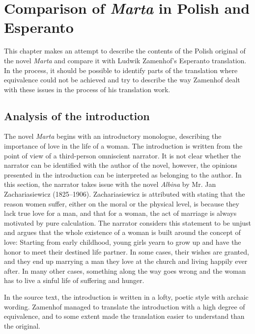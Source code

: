 
\chapter{Comparison of \textit{Marta} in Polish and Esperanto}

This chapter makes an attempt to describe the contents of the Polish original of the novel \textit{Marta} and compare it with Ludwik Zamenhof's Esperanto translation.
In the process, it should be possible to identify parts of the translation where equivalence could not be achieved and try to describe the way Zamenhof dealt with these issues in the process of his translation work.

\section{Analysis of the introduction}

The novel \textit{Marta} begins with an introductory monologue, describing the importance of love in the life of a woman.
The introduction is written from the point of view of a third-person omniscient narrator.
It is not clear whether the narrator can be identified with the author of the novel, however, the opinions presented in the introduction can be interpreted as belonging to the author.
In this section, the narrator takes issue with the novel \textit{Albina} by Mr. Jan Zachariasiewicz (1825--1906).
Zachariasiewicz is attributed with stating that the reason women suffer, either on the moral or the physical level, is because they lack true love for a man, and that for a woman, the act of marriage is always motivated by pure calculation.
The narrator considers this statement to be unjust and argues that the whole existence of a woman is built around the concept of love:
Starting from early childhood, young girls yearn to grow up and have the honor to meet their destined life partner.
In some cases, their wishes are granted, and they end up marrying a man they love at the church and living happily ever after.
In many other cases, something along the way goes wrong and the woman has to live a sinful life of suffering and hunger.

In the source text, the introduction is written in a lofty, poetic style with archaic wording.
Zamenhof managed to translate the introduction with a high degree of equivalence, and to some extent made the translation easier to understand than the original.

